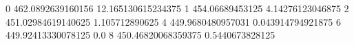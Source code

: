 0 462.0892639160156 12.165130615234375
1 454.06689453125 4.14276123046875
2 451.02984619140625 1.105712890625
4 449.9680480957031 0.043914794921875
6 449.92413330078125 0.0
8 450.46820068359375 0.5440673828125
